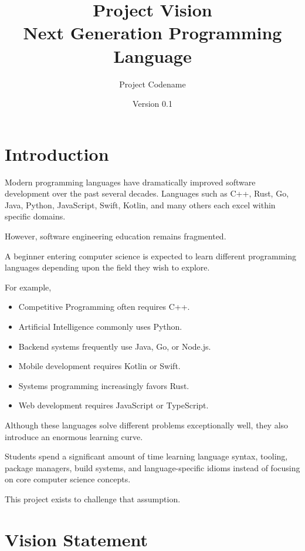 \documentclass[12pt]{article}
\title{
\Huge Project Vision \\
\vspace{0.3cm}
\Large Next Generation Programming Language
}
\author{Project Codename}
\date{Version 0.1}
\begin{document}
\maketitle
\tableofcontents
\newpage


\section{Introduction}

Modern programming languages have dramatically improved software development over the past several decades. Languages such as C++, Rust, Go, Java, Python, JavaScript, Swift, Kotlin, and many others each excel within specific domains.

However, software engineering education remains fragmented.

A beginner entering computer science is expected to learn different programming languages depending upon the field they wish to explore.

For example,

\begin{itemize}
    \item Competitive Programming often requires C++.
    \item Artificial Intelligence commonly uses Python.
    \item Backend systems frequently use Java, Go, or Node.js.
    \item Mobile development requires Kotlin or Swift.
    \item Systems programming increasingly favors Rust.
    \item Web development requires JavaScript or TypeScript.
\end{itemize}

Although these languages solve different problems exceptionally well, they also introduce an enormous learning curve.

Students spend a significant amount of time learning language syntax, tooling, package managers, build systems, and language-specific idioms instead of focusing on core computer science concepts.

This project exists to challenge that assumption.


\section{Vision Statement}
\end{document}
